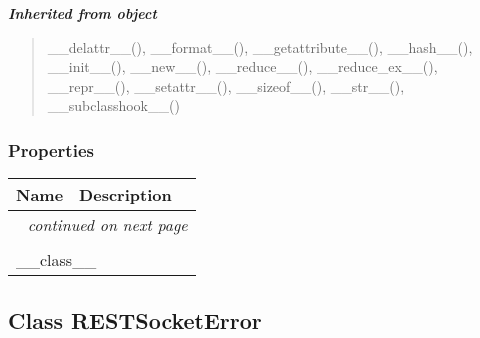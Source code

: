\large{\textbf{\textit{Inherited from object}}}

\begin{quote}
\_\_delattr\_\_(), \_\_format\_\_(), \_\_getattribute\_\_(), \_\_hash\_\_(), \_\_init\_\_(), \_\_new\_\_(), \_\_reduce\_\_(), \_\_reduce\_ex\_\_(), \_\_repr\_\_(), \_\_setattr\_\_(), \_\_sizeof\_\_(), \_\_str\_\_(), \_\_subclasshook\_\_()
\end{quote}


  \subsubsection{Properties}

    \vspace{-1cm}
\hspace{\varindent}\begin{longtable}{|p{\varnamewidth}|p{\vardescrwidth}|l}
\cline{1-2}
\cline{1-2} \centering \textbf{Name} & \centering \textbf{Description}& \\
\cline{1-2}
\endhead\cline{1-2}\multicolumn{3}{r}{\small\textit{continued on next page}}\\\endfoot\cline{1-2}
\endlastfoot\multicolumn{2}{|l|}{\textit{Inherited from object}}\\
\multicolumn{2}{|p{\varwidth}|}{\raggedright \_\_class\_\_}\\
\cline{1-2}
\end{longtable}



\subsection{Class RESTSocketError}

